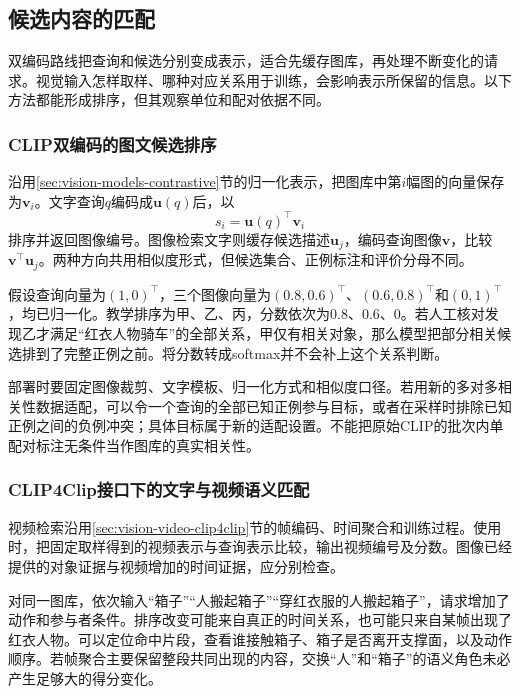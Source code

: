 \subsection{候选内容的匹配}
\label{sec:vision-understanding-candidate-matching}

双编码路线把查询和候选分别变成表示，适合先缓存图库，再处理不断变化的请求。视觉输入怎样取样、哪种对应关系用于训练，会影响表示所保留的信息。以下方法都能形成排序，但其观察单位和配对依据不同。

\subsubsection{CLIP双编码的图文候选排序}
\label{sec:vision-understanding-clip}

沿用\ref{sec:vision-models-contrastive}节的归一化表示，把图库中第$i$幅图的向量保存为$\bm v_i$。文字查询$q$编码成$\bm u(q)$后，以
\[
  s_i=\bm u(q)^\top\bm v_i
\]
排序并返回图像编号。图像检索文字则缓存候选描述$\bm u_j$，编码查询图像$\bm v$，比较$\bm v^\top\bm u_j$。两种方向共用相似度形式，但候选集合、正例标注和评价分母不同。

假设查询向量为$(1,0)^\top$，三个图像向量为$(0.8,0.6)^\top$、$(0.6,0.8)^\top$和$(0,1)^\top$，均已归一化。教学排序为甲、乙、丙，分数依次为0.8、0.6、0。若人工核对发现乙才满足“红衣人物骑车”的全部关系，甲仅有相关对象，那么模型把部分相关候选排到了完整正例之前。将分数转成softmax并不会补上这个关系判断。

部署时要固定图像裁剪、文字模板、归一化方式和相似度口径。若用新的多对多相关性数据适配，可以令一个查询的全部已知正例参与目标，或者在采样时排除已知正例之间的负例冲突；具体目标属于新的适配设置。不能把原始CLIP的批次内单配对标注无条件当作图库的真实相关性。

\subsubsection{CLIP4Clip接口下的文字与视频语义匹配}
\label{sec:vision-understanding-clip4clip}

视频检索沿用\ref{sec:vision-video-clip4clip}节的帧编码、时间聚合和训练过程。使用时，把固定取样得到的视频表示与查询表示比较，输出视频编号及分数。图像已经提供的对象证据与视频增加的时间证据，应分别检查。

对同一图库，依次输入“箱子”“人搬起箱子”“穿红衣服的人搬起箱子”，请求增加了动作和参与者条件。排序改变可能来自真正的时间关系，也可能只来自某帧出现了红衣人物。可以定位命中片段，查看谁接触箱子、箱子是否离开支撑面，以及动作顺序。若帧聚合主要保留整段共同出现的内容，交换“人”和“箱子”的语义角色未必产生足够大的得分变化。

